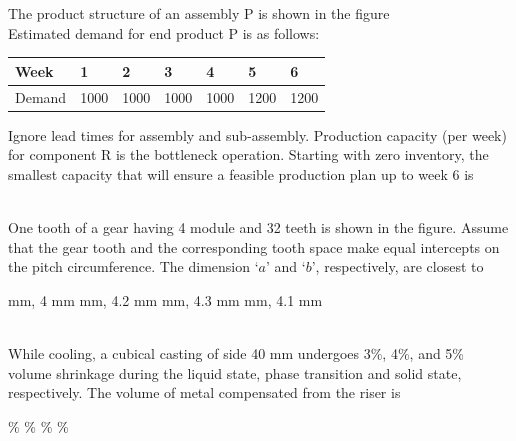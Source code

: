 \documentclass[addpoints,11pt]{exam}
\begin{document}
\begin{questions}
    \question The product structure of an assembly P is shown in the figure%
    \\Estimated demand for end product P is as follows:\\
    \begin{center}
        \begin{tabular}{|l|l|l|l|l|l|l|}
            \hline
            Week & 1 & 2 & 3 & 4 & 5 & 6\\\hline
            Demand & 1000 & 1000 & 1000 & 1000 & 1200 & 1200\\\hline
        \end{tabular}
    \end{center}
    Ignore lead  times for assembly and sub-assembly. Production capacity (per week) for component R is the bottleneck operation. Starting with zero inventory, the smallest capacity that will ensure a feasible production plan up to week 6 is

    \begin{oneparchoices}
    \end{oneparchoices}\\

    \question One tooth of a gear having 4 module and 32 teeth is shown in the figure. Assume that the gear tooth and the corresponding tooth space make equal intercepts on the pitch circumference. The dimension `$a$' and `$b$', respectively, are closest to%

    \begin{oneparchoices}
         mm, 4 mm
         mm, 4.2 mm
         mm, 4.3 mm
         mm, 4.1 mm
    \end{oneparchoices}\\

    \question While cooling, a cubical casting of side 40 mm undergoes 3\%, 4\%, and 5\% volume shrinkage during the liquid state, phase transition and solid state, respectively. The volume of metal compensated from the riser is\\

    \begin{oneparchoices}
        \%
        \%
        \%
        \%
    \end{oneparchoices}\\


\end{questions}
\end{document}
